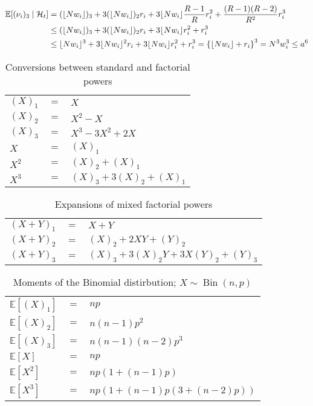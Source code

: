 \documentclass{article}
\newcommand{\E}{\mathbb{E}}
\newcommand{\1}[1]{\mathbbm{1}_{#1}}
\newcommand{\flnw}{\lfloor N w_i \rfloor}
\newcommand{\Ht}{\mathcal{H}_t}
\begin{document}
\begin{align}
\E[ (\nu_i)_3 \mid \Ht] 
&= (\flnw)_3 + 3(\flnw)_2 r_i + 3\flnw \frac{R-1}{R} r_i^2 + \frac{(R-1)(R-2)}{R^2} r_i^3 \notag\\
&\leq (\flnw)_3 + 3(\flnw)_2 r_i + 3\flnw r_i^2 +  r_i^3 \notag\\
&\leq \flnw^3 + 3 \flnw^2 r_i + 3 \flnw r_i^2 +  r_i^3
= \left\{ \flnw + r_i \right\}^3
= N^3 w_i^3
\leq a^6
\end{align}


\begin{table}[h]
\centering
\begin{tabular}{| l c l |}
\hline
$(X)_1$ & $=$ & $X$ \\
$(X)_2$ & $=$ & $X^2 - X$ \\
$(X)_3$ & $=$ & $X^3 - 3X^2 + 2X$ \\
$X$ & $=$ & $(X)_1$ \\
$X^2$ & $=$ & $(X)_2 + (X)_1$ \\
$X^3$ & $=$ & $(X)_3 + 3(X)_2 + (X)_1$ \\
\hline
\end{tabular}
\caption{Conversions between standard and factorial powers}
\end{table}

\begin{table}[h]
\centering
\begin{tabular}{| l c l |}
\hline
$(X+Y)_1$ & $=$ & $X + Y$ \\
$(X+Y)_2$ & $=$ & $(X)_2 + 2XY + (Y)_2$ \\
$(X+Y)_3$ & $=$ & $(X)_3 + 3(X)_2 Y + 3X(Y)_2 + (Y)_3$ \\
\hline
\end{tabular}
\caption{Expansions of mixed factorial powers}
\end{table}

\begin{table}[h]
\centering
\begin{tabular}{| l c l |}
\hline
$\E[(X)_1]$ & $=$ & $n p$ \\
$\E[(X)_2]$ & $=$ & $n (n-1) p^2$ \\
$\E[(X)_3]$ & $=$ & $n (n-1) (n-2) p^3$ \\
$\E[X]$ & $=$ & $n p$ \\
$\E[X^2]$ & $=$ & $n p (1 + (n-1)p )$ \\
$\E[X^3]$ & $=$ & $n p (1 + (n-1) p (3 + (n-2) p ) )$ \\
\hline
\end{tabular}
\caption{Moments of the Binomial distirbution; $X\sim \operatorname{Bin}(n,p)$}
\end{table}
\end{document}
